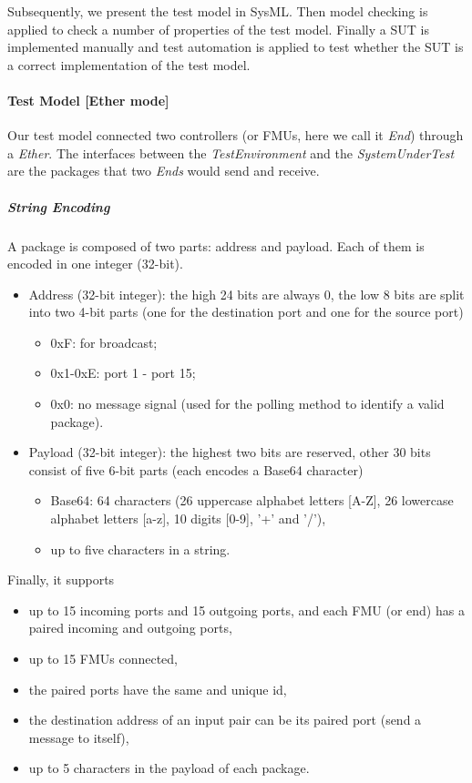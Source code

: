 Subsequently, we present the test model in SysML. Then model checking is applied to check a number of properties of the test model. Finally a SUT is implemented manually and test automation is applied to test whether the SUT is a correct implementation of the test model.

\paragraph{Test Model [Ether mode]}
Our test model connected two controllers (or FMUs, here we call it \emph{End}) through a \emph{Ether}. The interfaces between the \emph{TestEnvironment} and the \emph{SystemUnderTest} are the packages that two \emph{Ends} would send and receive.

\subparagraph{String Encoding}
\label{sssec:ether_encoding}
A package is composed of two parts: address and payload. Each of them is encoded in one integer (32-bit). 
\begin{itemize}
    \item Address (32-bit integer): the high 24 bits are always 0, the low 8 bits are split into two 4-bit parts (one for the destination port and one for the source port)
        \begin{itemize}
            \item 0xF: for broadcast;
            \item 0x1-0xE: port 1 - port 15;
            \item 0x0: no message signal (used for the polling method to identify a valid package).
        \end{itemize}
    \item Payload (32-bit integer): the highest two bits are reserved, other 30 bits consist of five 6-bit parts (each encodes a Base64 character)
        \begin{itemize}
            \item Base64: 64 characters (26 uppercase alphabet letters [A-Z], 26 lowercase alphabet letters [a-z], 10 digits [0-9], '+' and '/'),
            \item up to five characters in a string.
        \end{itemize}
\end{itemize}

Finally, it supports
\begin{itemize}
    \item up to 15 incoming ports and 15 outgoing ports, and each FMU (or end) has a paired incoming and outgoing ports,
    \item up to 15 FMUs connected,
    \item the paired ports have the same and unique id,
    \item the destination address of an input pair can be its paired port (send a message to itself),
    \item up to 5 characters in the payload of each package.
\end{itemize}

